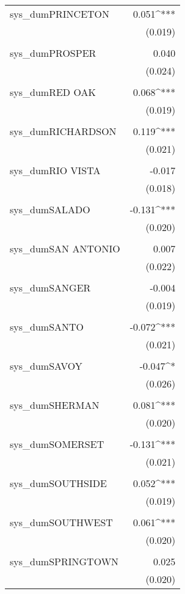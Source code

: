 \begin{table}[!htbp]
\begin{tabular}{@{\extracolsep{5pt}}lD{.}{.}{-3} }
 sys\_dumPRINCETON & 0.051^{***} \\ 
  & (0.019) \\ 
  & \\ 
 sys\_dumPROSPER & 0.040 \\ 
  & (0.024) \\ 
  & \\ 
 sys\_dumRED OAK & 0.068^{***} \\ 
  & (0.019) \\ 
  & \\ 
 sys\_dumRICHARDSON & 0.119^{***} \\ 
  & (0.021) \\ 
  & \\ 
 sys\_dumRIO VISTA & -0.017 \\ 
  & (0.018) \\ 
  & \\ 
 sys\_dumSALADO & -0.131^{***} \\ 
  & (0.020) \\ 
  & \\ 
 sys\_dumSAN ANTONIO & 0.007 \\ 
  & (0.022) \\ 
  & \\ 
 sys\_dumSANGER & -0.004 \\ 
  & (0.019) \\ 
  & \\ 
 sys\_dumSANTO & -0.072^{***} \\ 
  & (0.021) \\ 
  & \\ 
 sys\_dumSAVOY & -0.047^{*} \\ 
  & (0.026) \\ 
  & \\ 
 sys\_dumSHERMAN & 0.081^{***} \\ 
  & (0.020) \\ 
  & \\ 
 sys\_dumSOMERSET & -0.131^{***} \\ 
  & (0.021) \\ 
  & \\ 
 sys\_dumSOUTHSIDE & 0.052^{***} \\ 
  & (0.019) \\ 
  & \\ 
 sys\_dumSOUTHWEST & 0.061^{***} \\ 
  & (0.020) \\ 
  & \\ 
 sys\_dumSPRINGTOWN & 0.025 \\ 
  & (0.020) \\ 

\end{tabular}
\end{table}
